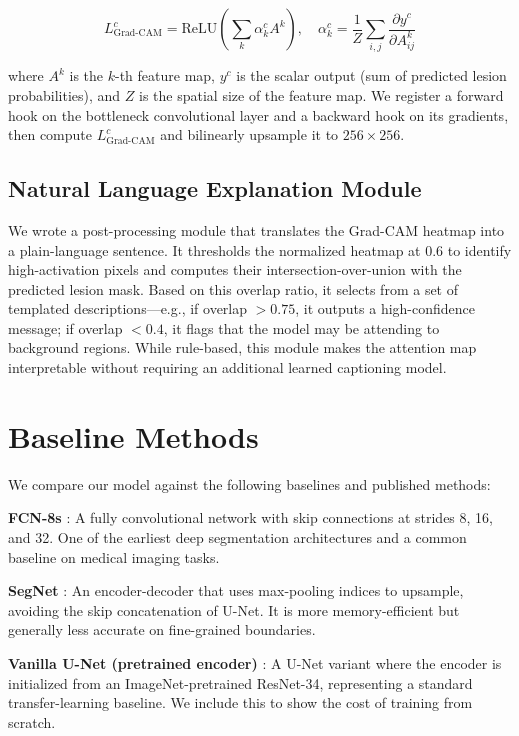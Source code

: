 \documentclass[10pt,journal,compsoc]{IEEEtran}
\begin{document}
\begin{equation}
L^c_{\text{Grad-CAM}} = \text{ReLU}\!\left(\sum_k \alpha^c_k A^k\right), \quad \alpha^c_k = \frac{1}{Z}\sum_{i,j} \frac{\partial y^c}{\partial A^k_{ij}}
\end{equation}

where $A^k$ is the $k$-th feature map, $y^c$ is the scalar output (sum of predicted lesion probabilities), and $Z$ is the spatial size of the feature map. We register a forward hook on the bottleneck convolutional layer and a backward hook on its gradients, then compute $L^c_{\text{Grad-CAM}}$ and bilinearly upsample it to $256 \times 256$.

\subsection{Natural Language Explanation Module}
We wrote a post-processing module that translates the Grad-CAM heatmap into a plain-language sentence. It thresholds the normalized heatmap at 0.6 to identify high-activation pixels and computes their intersection-over-union with the predicted lesion mask. Based on this overlap ratio, it selects from a set of templated descriptions—e.g., if overlap $> 0.75$, it outputs a high-confidence message; if overlap $< 0.4$, it flags that the model may be attending to background regions. While rule-based, this module makes the attention map interpretable without requiring an additional learned captioning model.

\section{Baseline Methods}

We compare our model against the following baselines and published methods:

\textbf{FCN-8s} \cite{fcn}: A fully convolutional network with skip connections at strides 8, 16, and 32. One of the earliest deep segmentation architectures and a common baseline on medical imaging tasks.

\textbf{SegNet} \cite{segnet}: An encoder-decoder that uses max-pooling indices to upsample, avoiding the skip concatenation of U-Net. It is more memory-efficient but generally less accurate on fine-grained boundaries.

\textbf{Vanilla U-Net (pretrained encoder)} \cite{unet}: A U-Net variant where the encoder is initialized from an ImageNet-pretrained ResNet-34, representing a standard transfer-learning baseline. We include this to show the cost of training from scratch.
\end{document}

